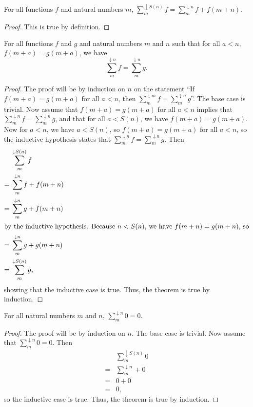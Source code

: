 \documentclass[../../math.tex]{subfiles}
\begin{document}
\begin{theorem}
    For all functions $f$ and natural numbers $m$, $\sum_m^{\downarrow S(n)} f =
    \sum_m^{\downarrow n} f + f(m + n)$.
\end{theorem}
\begin{proof}
    This is true by definition.
\end{proof}

\begin{theorem}
    For all functions $f$ and $g$ and natural numbers $m$ and $n$ such that for
    all $a < n$, $f(m + a) = g(m + a)$, we have
    \[
        \sum_m^{\downarrow n} f = \sum_m^{\downarrow n} g.
    \]
\end{theorem}
\begin{proof}
    The proof will be by induction on $n$ on the statement ``If $f(m + a) = g(m
    + a)$ for all $a < n$, then $\sum_m^{\downarrow m} f = \sum_m^{\downarrow n}
    g$''.  The base case is trivial.  Now assume that $f(m + a) = g(m + a)$ for
    all $a < n$ implies that $\sum_m^{\downarrow n} f = \sum_m^{\downarrow n}
    g$, and that for all $a < S(n)$, we have $f(m + a) = g(m + a)$.  Now for $a
    < n$, we have $a < S(n)$, so $f(m + a) = g(m + a)$ for all $a < n$, so the
    inductive hypothesis states that $\sum_m^{\downarrow n} f =
    \sum_m^{\downarrow n} g$.  Then
    \begin{align*}
           & \sum_m^{\downarrow S(n)} f \\
        ={}& \sum_m^{\downarrow n} f + f(m + n) \\
        ={}& \sum_m^{\downarrow n} g + f(m + n) \\
    \intertext{by the inductive hypothesis.  Because $n < S(n)$, we have $f(m +
    n) = g(m + n)$, so}
        ={}& \sum_m^{\downarrow n} g + g(m + n) \\
        ={}& \sum_m^{\downarrow S(n)} g,
    \end{align*}
    showing that the inductive case is true.  Thus, the theorem is true by
    induction.
\end{proof}

\begin{theorem}
    For all natural numbers $m$ and $n$, $\sum_m^{\downarrow n} 0 = 0$.
\end{theorem}
\begin{proof}
    The proof will be by induction on $n$.  The base case is trivial.  Now
    assume that $\sum_m^{\downarrow n} 0 = 0$.  Then
    \begin{align*}
           & \sum_m^{\downarrow S(n)} 0 \\
        ={}& \sum_m^{\downarrow n} + 0 \\
        ={}& 0 + 0 \\
        ={}& 0,
    \end{align*}
    so the inductive case is true.  Thus, the theorem is true by induction.
\end{proof}
\end{document}
